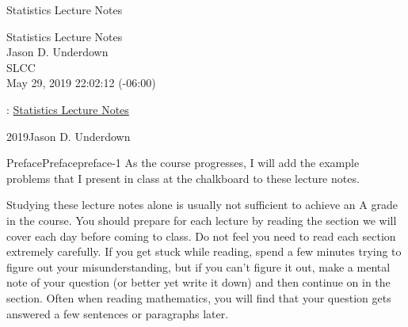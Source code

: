 \documentclass[oneside,10pt,]{book}
\numberwithin{equation}{section}
\begin{document}
\frontmatter
\thispagestyle{empty}
{\centering
\vspace*{0.28\textheight}
{\Huge Statistics Lecture Notes}\\}
\clearpage
\thispagestyle{empty}
\null%
\clearpage
\thispagestyle{empty}
{\centering
\vspace*{0.14\textheight}
{\Huge Statistics Lecture Notes}\\[3\baselineskip]
{\Large Jason D. Underdown}\\[0.5\baselineskip]
{\Large SLCC}\\[3\baselineskip]
{\Large May 29, 2019 22:02:12 (-06:00)}\\}
\clearpage
\thispagestyle{empty}
\hypertarget{colophon-1}{}
: \href{http:\slash{}\slash{}www.math.utah.edu\slash{}\textasciitilde{}jasonu\slash{}stats\slash{}}{Statistics Lecture Notes}\par\medskip
\noindent\textcopyright{}2019\quad{}Jason D. Underdown\par\medskip
{}
\null\clearpage
%
%
\typeout{************************************************}
\typeout{************************************************}
%
\begin{preface}{Preface}{}{Preface}{}{}{preface-1}
\hypertarget{p-1}{}%
As the course progresses, I will add the example problems that I present in class at the chalkboard to these lecture notes.%
\par
\hypertarget{p-2}{}%
Studying these lecture notes alone is usually not sufficient to achieve an A grade in the course. You should prepare for each lecture by reading the section we will cover each day before coming to class. Do not feel you need to read each section extremely carefully. If you get stuck while reading, spend a few minutes trying to figure out your misunderstanding, but if you can't figure it out, make a mental note of your question (or better yet write it down) and then continue on in the section. Often when reading mathematics, you will find that your question gets answered a few sentences or paragraphs later.%
\end{preface}
\end{document}
